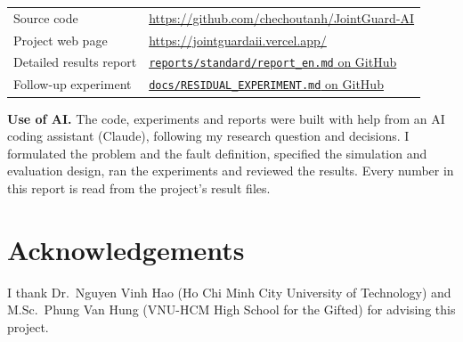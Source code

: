 \documentclass[11pt,a4paper]{article}
\begin{document}
\begin{center}
\begin{tabularx}{.92\linewidth}{lX}
\toprule
Source code & \url{https://github.com/chechoutanh/JointGuard-AI} \\
Project web page & \url{https://jointguardaii.vercel.app/} \\
Detailed results report & \href{https://github.com/chechoutanh/JointGuard-AI/blob/main/reports/standard/report_en.md}{\texttt{reports/standard/report\_en.md} on GitHub} \\
Follow-up experiment & \href{https://github.com/chechoutanh/JointGuard-AI/blob/main/docs/RESIDUAL_EXPERIMENT.md}{\texttt{docs/RESIDUAL\_EXPERIMENT.md} on GitHub} \\
\bottomrule
\end{tabularx}
\end{center}

\noindent\textbf{Use of AI.} The code, experiments and reports were built with help from an AI coding assistant
(Claude), following my research question and decisions. I formulated the problem and the fault definition, specified
the simulation and evaluation design, ran the experiments and reviewed the results. Every number in this report is read
from the project's result files.

\section*{Acknowledgements}
I thank Dr.\ Nguyen Vinh Hao (Ho Chi Minh City University of Technology) and M.Sc.\ Phung Van Hung (VNU-HCM High School
for the Gifted) for advising this project.
\end{document}
